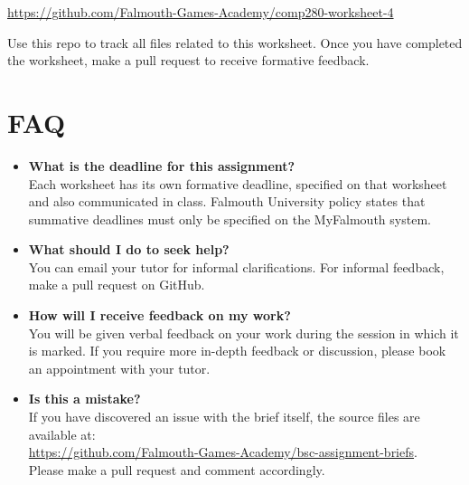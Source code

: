 \documentclass{../../../fal_assignment}
\begin{document}
\hyperlink{https://github.com/Falmouth-Games-Academy/comp280-worksheet-4}{https://github.com/Falmouth-Games-Academy/comp280-worksheet-4} 

Use this repo to track all files related to this worksheet. Once you have completed the worksheet, make a pull request to receive formative feedback. 


\section*{FAQ}

\begin{itemize}
	\item 	\textbf{What is the deadline for this assignment?} \\ 
			Each worksheet has its own formative deadline, specified on that worksheet and also communicated in class.
    		Falmouth University policy states that summative deadlines must only be specified on the MyFalmouth system.
    		
	\item 	\textbf{What should I do to seek help?} \\ 
    		You can email your tutor for informal clarifications. For informal feedback, make a pull request on GitHub. 
    		
	\item 	\textbf{How will I receive feedback on my work?} \\ 
    		You will be given verbal feedback on your work during the session in which it is marked.
    		If you require more in-depth feedback or discussion, please book an appointment with your tutor.
    		
    	\item 	\textbf{Is this a mistake?} \\ 	
    		If you have discovered an issue with the brief itself, the source files are available at: \\
    		\url{https://github.com/Falmouth-Games-Academy/bsc-assignment-briefs}.\\
    		 Please make a pull request and comment accordingly.
\end{itemize}
\end{document}
